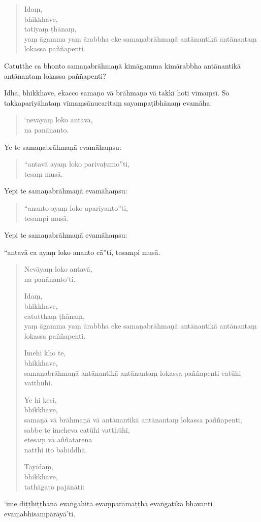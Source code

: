 \documentclass[11pt,twoside,openright]{book}
\begin{document}
\begin{verse}
Idaṃ,\\
\vin  bhikkhave,\\
\vin  tatiyaṃ ṭhānaṃ,\\
\vin  yaṃ āgamma yaṃ ārabbha eke samaṇabrāhmaṇā antānantikā antānantaṃ lokassa paññapenti.

\end{verse}
\pstart
Catutthe ca bhonto samaṇabrāhmaṇā kimāgamma kimārabbha antānantikā antānantaṃ lokassa paññapenti?
\pend

\pstart
Idha, bhikkhave, ekacco samaṇo vā brāhmaṇo vā takkī hoti vīmaṃsī. So takkapariyāhataṃ vīmaṃsānucaritaṃ sayampaṭibhānaṃ evamāha:
\pend

\begin{verse}
‘nevāyaṃ loko antavā,\\
\vin  na panānanto.

\end{verse}
\pstart
Ye te samaṇabrāhmaṇā evamāhaṃsu:
\pend

\begin{verse}
“antavā ayaṃ loko parivaṭumo”ti,\\
\vin  tesaṃ musā.

\end{verse}
\pstart
Yepi te samaṇabrāhmaṇā evamāhaṃsu:
\pend

\begin{verse}
“ananto ayaṃ loko apariyanto”ti,\\
\vin  tesampi musā.

\end{verse}
\pstart
Yepi te samaṇabrāhmaṇā evamāhaṃsu:
\pend

\pstart
“antavā ca ayaṃ loko ananto cā”ti, tesampi musā.
\pend

\begin{verse}
Nevāyaṃ loko antavā,\\
\vin  na panānanto’ti.

Idaṃ,\\
\vin  bhikkhave,\\
\vin  catutthaṃ ṭhānaṃ,\\
\vin  yaṃ āgamma yaṃ ārabbha eke samaṇabrāhmaṇā antānantikā antānantaṃ lokassa paññapenti.

Imehi kho te,\\
\vin  bhikkhave,\\
\vin  samaṇabrāhmaṇā antānantikā antānantaṃ lokassa paññapenti catūhi vatthūhi.

Ye hi keci,\\
\vin  bhikkhave,\\
\vin  samaṇā vā brāhmaṇā vā antānantikā antānantaṃ lokassa paññapenti,\\
\vin  sabbe te imeheva catūhi vatthūhi,\\
\vin  etesaṃ vā aññatarena\\
 natthi ito bahiddhā.

Tayidaṃ,\\
\vin  bhikkhave,\\
\vin  tathāgato pajānāti:

\end{verse}
\pstart
‘ime diṭṭhiṭṭhānā evaṅgahitā evaṃparāmaṭṭhā evaṅgatikā bhavanti evaṃabhisamparāyā’ti.
\pend
\end{document}
